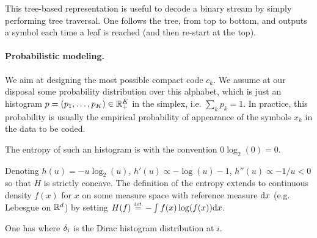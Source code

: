 
This tree-based representation is useful to decode a binary stream by simply performing tree traversal. One follows the tree, from top to bottom, and outputs a symbol each time a leaf is reached (and then re-start at the top). 


\paragraph{Probabilistic modeling.}

We aim at designing the most possible compact code $c_k$. 
%
We assume at our disposal some probability distribution over this alphabet, which is just an histogram $p=(p_1,\ldots,p_K) \in \mathbb{R}_+^K$ in the simplex, i.e. $\sum_k p_k=1$. 
%
In practice, this probability is usually the empirical probability of appearance of the symbols $x_k$ in the data to be coded. 


The entropy of such an histogram is 
with the convention $0\log_2(0)=0$. 

Denoting $h(u)=-u \log_2(u)$, $h'(u) \propto -\log(u)-1$, $h''(u) \propto -1/u<0$ so that $H$ is strictly concave. The definition of the entropy extends to continuous density $f(x)$ for $x$ on some measure space with reference measure $\mathrm{d} x$ (e.g. Lebesgue on $\mathbb{R}^d$) by setting $H(f) \stackrel{\mbox{\upshape\tiny def.}}{=} -\int f(x) \log(f(x)) \mathrm{d} x$. 






\begin{lem} One has
where $\delta_i$ is the Dirac histogram distribution at $i$. 
\end{lem}


